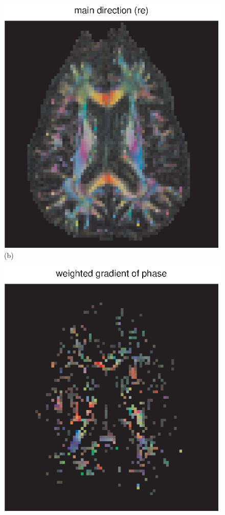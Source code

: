 \documentclass[authoryear,preprint,12pt]{elsarticle}
\begin{document}
\begin{figure}[p]
\begin{center}
\begin{minipage}[]{0.42\textwidth}
      \includegraphics[width=\textwidth]{tensdir55ny.eps}
       (b)
    \end{minipage}
      \begin{minipage}[]{0.42\textwidth}
      \centering
       \includegraphics[width=\textwidth]{gradphase55bny.eps}

\end{minipage}
\end{center}
\end{figure}
\end{document}
